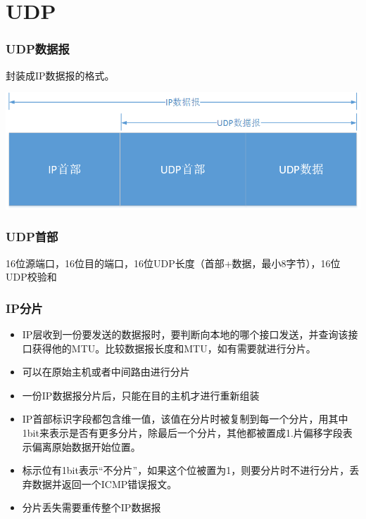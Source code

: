 \section{UDP}

\subsubsection{UDP数据报}

封装成IP数据报的格式。

\includegraphics[scale=0.5]{protocol/resources/UDP数据报.png}


\subsubsection{UDP首部}

16位源端口，16位目的端口，16位UDP长度（首部+数据，最小8字节），16位UDP校验和

\subsubsection{IP分片}

\begin{itemize}
\item IP层收到一份要发送的数据报时，要判断向本地的哪个接口发送，并查询该接口获得他的MTU。比较数据报长度和MTU，如有需要就进行分片。

\item 可以在原始主机或者中间路由进行分片

\item 一份IP数据报分片后，只能在目的主机才进行重新组装

\item IP首部标识字段都包含维一值，该值在分片时被复制到每一个分片，用其中1bit来表示是否有更多分片，除最后一个分片，其他都被置成1.片偏移字段表示偏离原始数据开始位置。

\item 标示位有1bit表示“不分片”，如果这个位被置为1，则要分片时不进行分片，丢弃数据并返回一个ICMP错误报文。

\item 分片丢失需要重传整个IP数据报
\end{itemize}

